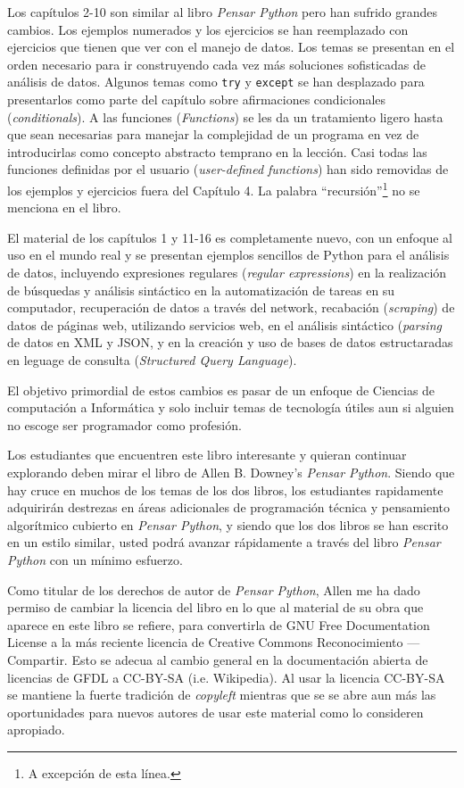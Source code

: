 Los cap\'itulos 2-10 son similar al libro \emph{Pensar Python}
pero han sufrido grandes cambios. Los ejemplos numerados y los ejercicios se han reemplazado con ejercicios que tienen que ver con el manejo de datos. Los temas se presentan en el orden necesario para ir construyendo cada vez m\'as soluciones sofisticadas de an\'alisis de datos. Algunos temas como {\tt try} y
{\tt except} se han desplazado para presentarlos como parte del cap\'itulo sobre afirmaciones condicionales (\textit{conditionals}). A las funciones (\textit{Functions}) se les da un tratamiento ligero hasta que sean necesarias para manejar la complejidad de un programa en vez de introducirlas como concepto abstracto temprano en la lecci\'on. Casi todas las funciones definidas por el usuario (\textit{user-defined functions}) han sido removidas de los ejemplos y ejercicios fuera del Cap\'itulo 4. La palabra ``recursi\'on''\footnote{A excepci\'on de esta l\'inea.} no se menciona en el libro.

El material de los cap\'itulos 1 y 11-16 es completamente nuevo, con un enfoque al uso en el mundo real y se presentan ejemplos sencillos de Python para el an\'alisis de datos, incluyendo expresiones regulares (\textit{regular expressions}) en la realizaci\'on de b\'usquedas y an\'alisis sint\'actico en la automatizaci\'on de tareas en su computador, recuperaci\'on de datos a trav\'es del network, recabaci\'on (\textit{scraping}) de datos de p\'aginas web, utilizando servicios web, en el an\'alisis sint\'actico (\textit{parsing} de datos en XML y JSON, y en la creaci\'on y uso de bases de datos estructaradas en leguage de consulta (\textit{Structured Query Language}).

El objetivo primordial de estos cambios es pasar de un enfoque de Ciencias de computaci\'on a Inform\'atica y solo incluir temas de tecnolog\'ia \'utiles aun si alguien no escoge ser programador como profesi\'on.

Los estudiantes que encuentren este libro interesante y quieran continuar explorando deben mirar el libro de Allen B. Downey's \emph{Pensar Python}. Siendo que hay cruce en muchos de los temas de los dos libros,
los estudiantes rapidamente adquirir\'an destrezas en \'areas adicionales de programaci\'on t\'ecnica y pensamiento algor\'itmico cubierto en \emph{Pensar Python}, y siendo que los dos libros se han escrito en un estilo similar, usted podr\'a avanzar r\'apidamente a trav\'es del libro \emph{Pensar Python} con un m\'inimo esfuerzo.

Como titular de los derechos de autor de \emph{Pensar Python},
Allen me ha dado permiso de cambiar la licencia del libro en lo que al material de su obra que aparece en este libro se refiere, para convertirla de GNU Free Documentation License 
a la m\'as reciente licencia de Creative Commons Reconocimiento --- Compartir. Esto se adecua al cambio general en la documentaci\'on abierta de licencias de GFDL a CC-BY-SA (i.e. Wikipedia).
Al usar la licencia CC-BY-SA se mantiene la fuerte tradici\'on de \textit{copyleft} mientras  que se se abre aun m\'as las oportunidades para nuevos autores de usar este material como lo consideren apropiado.

